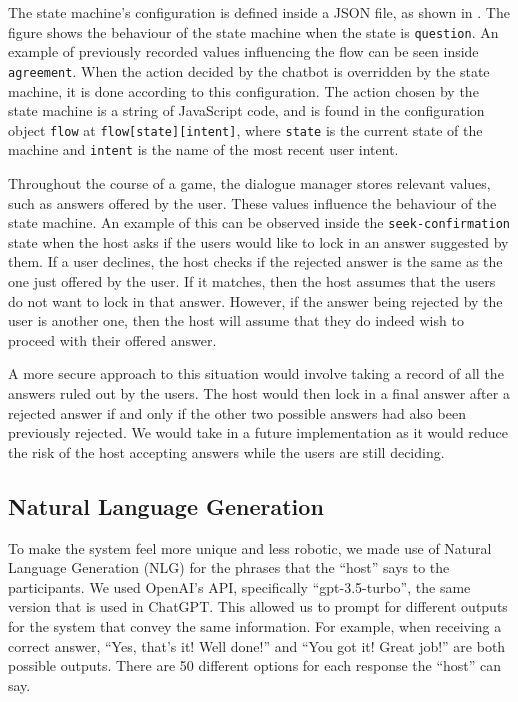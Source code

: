 \documentclass[hidelinks, 11pt]{article}
\begin{document}
The state machine's configuration is defined inside a JSON file, as shown in . The figure shows the behaviour of the state machine when the state is \verb|question|. An example of previously recorded values influencing the flow can be seen inside \verb|agreement|. When the action decided by the chatbot is overridden by the state machine, it is done according to this configuration. The action chosen by the state machine is a string of JavaScript code, and is found in the configuration object \verb|flow| at \verb|flow[state][intent]|, where \verb|state| is the current state of the machine and \verb|intent| is the name of the most recent user intent.

Throughout the course of a game, the dialogue manager stores relevant values, such as answers offered by the user. These values influence the behaviour of the state machine. An example of this can be observed inside the \verb|seek-confirmation| state when the host asks if the users would like to lock in an answer suggested by them. If a user declines, the host checks if the rejected answer is the same as the one just offered by the user. If it matches, then the host assumes that the users do not want to lock in that answer. However, if the answer being rejected by the user is another one, then the host will assume that they do indeed wish to proceed with their offered answer.

A more secure approach to this situation would involve taking a record of all the answers ruled out by the users. The host would then lock in a final answer after a rejected answer if and only if the other two possible answers had also been previously rejected. We would take in a future implementation as it would reduce the risk of the host accepting answers while the users are still deciding.

\subsection{Natural Language Generation}
\label{subsec:nlg}

To make the system feel more unique and less robotic, we made use of Natural Language Generation (NLG) for the phrases that the “host” says to the participants. We used OpenAI's API, specifically “gpt-3.5-turbo”, the same version that is used in ChatGPT. This allowed us to prompt for different outputs for the system that convey the same information. For example, when receiving a correct answer, “Yes, that's it! Well done!” and “You got it! Great job!” are both possible outputs. There are 50 different options for each response the “host” can say.
\end{document}
